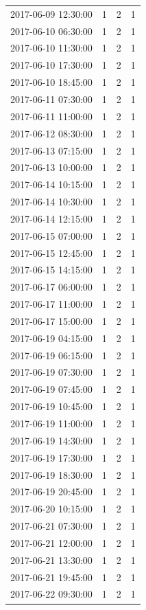 \begin{tabular}{lrrr}
2017-06-09 12:30:00 & 1 & 2 & 1 \\
2017-06-10 06:30:00 & 1 & 2 & 1 \\
2017-06-10 11:30:00 & 1 & 2 & 1 \\
2017-06-10 17:30:00 & 1 & 2 & 1 \\
2017-06-10 18:45:00 & 1 & 2 & 1 \\
2017-06-11 07:30:00 & 1 & 2 & 1 \\
2017-06-11 11:00:00 & 1 & 2 & 1 \\
2017-06-12 08:30:00 & 1 & 2 & 1 \\
2017-06-13 07:15:00 & 1 & 2 & 1 \\
2017-06-13 10:00:00 & 1 & 2 & 1 \\
2017-06-14 10:15:00 & 1 & 2 & 1 \\
2017-06-14 10:30:00 & 1 & 2 & 1 \\
2017-06-14 12:15:00 & 1 & 2 & 1 \\
2017-06-15 07:00:00 & 1 & 2 & 1 \\
2017-06-15 12:45:00 & 1 & 2 & 1 \\
2017-06-15 14:15:00 & 1 & 2 & 1 \\
2017-06-17 06:00:00 & 1 & 2 & 1 \\
2017-06-17 11:00:00 & 1 & 2 & 1 \\
2017-06-17 15:00:00 & 1 & 2 & 1 \\
2017-06-19 04:15:00 & 1 & 2 & 1 \\
2017-06-19 06:15:00 & 1 & 2 & 1 \\
2017-06-19 07:30:00 & 1 & 2 & 1 \\
2017-06-19 07:45:00 & 1 & 2 & 1 \\
2017-06-19 10:45:00 & 1 & 2 & 1 \\
2017-06-19 11:00:00 & 1 & 2 & 1 \\
2017-06-19 14:30:00 & 1 & 2 & 1 \\
2017-06-19 17:30:00 & 1 & 2 & 1 \\
2017-06-19 18:30:00 & 1 & 2 & 1 \\
2017-06-19 20:45:00 & 1 & 2 & 1 \\
2017-06-20 10:15:00 & 1 & 2 & 1 \\
2017-06-21 07:30:00 & 1 & 2 & 1 \\
2017-06-21 12:00:00 & 1 & 2 & 1 \\
2017-06-21 13:30:00 & 1 & 2 & 1 \\
2017-06-21 19:45:00 & 1 & 2 & 1 \\
2017-06-22 09:30:00 & 1 & 2 & 1 \\

\end{tabular}

